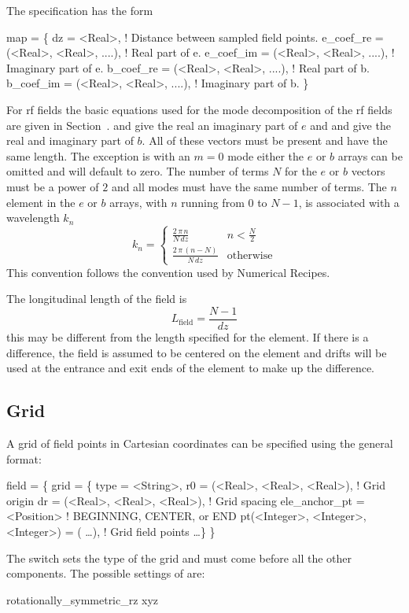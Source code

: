 The  specification has the form
\begin{example}
  map = \{
    dz        = <Real>,    ! Distance between sampled field points.
    e_coef_re = (<Real>, <Real>, ....),  ! Real part of e.
    e_coef_im = (<Real>, <Real>, ....),  ! Imaginary part of e.
    b_coef_re = (<Real>, <Real>, ....),  ! Real part of b.
    b_coef_im = (<Real>, <Real>, ....),  ! Imaginary part of b.
  \}
\end{example}
For rf fields the basic equations used for the mode decomposition of
the rf fields are given in Section~. 
 and  give the real an imaginary part of $e$ and
 and  give the real and imaginary part of $b$. All
of these vectors must be present and have the same length. The
exception is with an $m = 0$ mode either the $e$ or $b$ arrays can be
omitted and will default to zero. The number of terms $N$ for the $e$
or $b$ vectors must be a power of $2$ and all modes must have the same
number of terms. The $n$\Th element in the $e$ or $b$ arrays, with $n$
running from 0 to $N-1$, is associated with a wavelength $k_n$
\begin{equation}
  k_n = \begin{cases}
    \frac{2 \, \pi \, n}{N \, dz} & n < \frac{N}{2} \\
    \frac{2 \, \pi \, (n-N)}{N \, dz} & \text{otherwise}
  \end{cases}
\end{equation}
This convention follows the convention used by Numerical
Recipes\cite{b:nr}.  

 The longitudinal length
of the field is
\begin{equation}
  L_{\text{field}} = \frac{N - 1}{dz}
\end{equation}
this may be different from the length  specified for the
element. If there is a difference, the field is assumed to be centered
on the element and drifts will be used at the entrance and exit ends
of the element to make up the difference.

\subsection {Grid}
\label{ss:grid}

A grid of field points in Cartesian coordinates can be specified using the general format:
\begin{example}
  field = \{
    grid = \{ 
      type = <String>,
      r0   = (<Real>, <Real>, <Real>),  ! Grid origin 
      dr   = (<Real>, <Real>, <Real>),  ! Grid spacing
      ele_anchor_pt = <Position>        ! BEGINNING, CENTER, or END
      pt(<Integer>, <Integer>, <Integer>) = ( \ldots ),  ! Grid field points
      \ldots \} \}
\end{example}
The  switch sets the type of the grid and must come before
all the other components. The possible settings of  are:
\begin{example} 
  rotationally_symmetric_rz
  xyz
\end{example}

